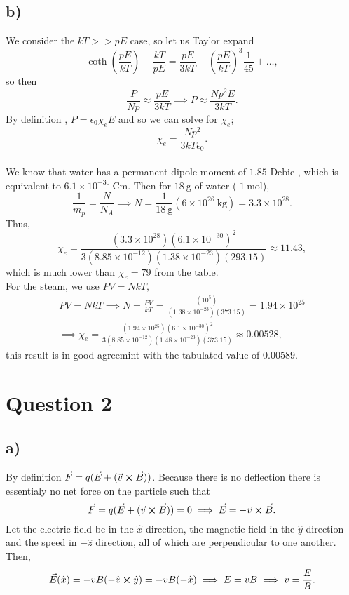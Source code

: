 \documentclass[12pt]{article}
\newcommand{\ep}{\epsilon}
\theoremstyle{definition}
\theoremstyle{definition}
\theoremstyle{definition}
\theoremstyle{definition}
\theoremstyle{definition}
\theoremstyle{example}
\theoremstyle{note}
\theoremstyle{remark}
\theoremstyle{example}
\begin{document}
			\subsection*{b) }
				We consider the $kT >> pE$ case, so let us Taylor expand 
				$$ \coth\left(\frac{pE}{kT}\right) - \frac{kT}{pE} = \frac{pE}{3kT} - \left(\frac{pE}{kT}\right)^{3} \frac{1}{45} + \dots ,$$
				so then 
				$$ \frac{P}{Np} \approx \frac{pE}{3kT}\implies P \approx \frac{Np^{2} E}{3 kT}.$$
				By definition , $P = \ep_{0}\chi_{e} E$ and so we can solve for $\chi_{e}$; 
				$$ \chi_{e} = \frac{Np^{2}}{3kT \ep_{0}}.$$
				\\
				\noindent We know that water has a permanent dipole moment of $1.85 $ Debie , which is equivalent to $6.1 \times 10^{-30 } \ \si{\coulomb\meter}$. Then for $18 \ \si{\gram}$ of water ( $1 \ \si{\mole}$), 
				$$ \frac{1}{m_{p}} = \frac{N}{N_{A}} \implies N = \frac{1}{18 \ \si{\gram}} (6 \times 10^{26} \ \si{\kilo\gram}) = 3.3 \times 10^{28}.$$
				Thus, 
				$$ \chi_{e} = \frac{(3.3 \times 10^{28})(6.1 \times 10^{-30})^{2} }{3(8.85 \times 10^{-12})(1.38 \times 10^{-23})(293.15)} \approx 11.43,$$
				which is much lower than $\chi_{e} = 79 $ from the table.\\ 
				
				\noindent For the steam, we use $PV = NkT, $
				\begin{gather*}
					 PV = NkT \implies N = \frac{PV}{kT} = \frac{(10^{5})}{(1.38\times 10^{-23}) (373.15)} = 1.94 \times 10^{25}\\
					 \implies \chi_{e} = \frac{(1.94 \times 10^{25})(6.1 \times 10^{-30})^{2}}{3 (8.85\times 10^{-12})(1.48\times 10^{-23})(373.15)} \approx 0.00528,
				\end{gather*}
				this result is in good agreemint with the tabulated value of $0.00589$.
				
		\section*{Question 2}
		\subsection*{a) }
		
			By definition $\vec{F} = q(\vec{E} + (\vec{v} \cross \vec{B}))$. Because there is no deflection there is essentialy no net force on the particle such that 
			$$ \vec{F} = q(\vec{E} + (\vec{v} \cross \vec{B})) = 0 \implies \vec{E} = -\vec{v} \cross \vec{B}.$$
			Let the electric field be in the $\hat{x}$ direction, the magnetic field in the $\hat{y}$ direction and the speed in $-\hat{z}$ direction, all of  which are perpendicular to one another. Then, 
			\begin{gather*}
				\vec{E} (\hat{x}) = -vB(-\hat{z} \cross \hat{y}) = -vB (-\hat{x}) \implies E = vB \implies v = \frac{E}{B}.
			\end{gather*}
\end{document}
